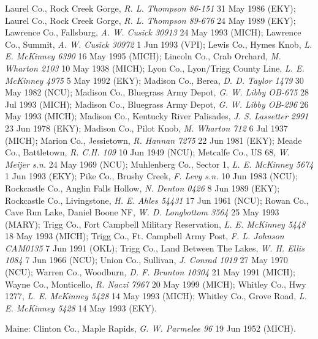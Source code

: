 \documentclass{article}
\begin{document}
Laurel Co., Rock Creek Gorge, \textit{R. L. Thompson 86-151} 31 May 1986 (EKY);
Laurel Co., Rock Creek Gorge, \textit{R. L. Thompson 89-676} 24 May 1989 (EKY);
Lawrence Co., Fallsburg, \textit{A. W. Cusick 30913} 24 May 1993 (MICH);
Lawrence Co., Summit, \textit{A. W. Cusick 30972} 1 Jun 1993 (VPI);
Lewis Co., Hymes Knob, \textit{L. E. McKinney 6390} 16 May 1995 (MICH);
Lincoln Co., Crab Orchard, \textit{M. Wharton 2103} 10 May 1938 (MICH);
Lyon Co., Lyon/Trigg County Line, \textit{L. E. McKinney 4975} 5 May 1992 (EKY);
Madison Co., Berea, \textit{D. D. Taylor 1479} 30 May 1982 (NCU);
Madison Co., Bluegrass Army Depot, \textit{G. W. Libby OB-675} 28 Jul 1993 (MICH);
Madison Co., Bluegrass Army Depot, \textit{G. W. Libby OB-296} 26 May 1993 (MICH);
Madison Co., Kentucky River Palisades, \textit{J. S. Lassetter 2991} 23 Jun 1978 (EKY);
Madison Co., Pilot Knob, \textit{M. Wharton 712} 6 Jul 1937 (MICH);
Marion Co., Jessietown, \textit{R. Hannan 7275} 22 Jun 1981 (EKY);
Meade Co., Battletown, \textit{R. C.H. 109} 10 Jun 1949 (NCU);
Metcalfe Co., US 68, \textit{W. Meijer s.n.} 24 May 1969 (NCU);
Muhlenberg Co., Sector 1, \textit{L. E. McKinney 5674} 1 Jun 1993 (EKY);
Pike Co.,  Brushy Creek, \textit{F. Levy s.n.} 10 Jun 1983 (NCU);
Rockcastle Co., Anglin Falls Hollow, \textit{N. Denton 0426} 8 Jun 1989 (EKY);
Rockcastle Co., Livingstone, \textit{H. E. Ahles 54431} 17 Jun 1961 (NCU);
Rowan Co., Cave Run Lake, Daniel Boone NF, \textit{W. D. Longbottom 3564} 25 May 1993 (MARY);
Trigg Co., Fort Campbell Military Reservation, \textit{L. E. McKinney 5448} 18 May 1993 (MICH);
Trigg Co., Ft. Campbell Army Post, \textit{F. L. Johnson CAM0135} 7 Jun 1991 (OKL);
Trigg Co., Land Between The Lakes, \textit{W. H. Ellis 1084} 7 Jun 1966 (NCU);
Union Co., Sullivan, \textit{J. Conrad 1019} 27 May 1970 (NCU);
Warren Co., Woodburn, \textit{D. F. Brunton 10304} 21 May 1991 (MICH);
Wayne Co., Monticello, \textit{R. Naczi 7967} 20 May 1999 (MICH);
Whitley Co., Hwy 1277, \textit{L. E. McKinney 5428} 14 May 1993 (MICH);
Whitley Co., Grove Road, \textit{L. E. McKinney 5428} 14 May 1993 (EKY).

Maine:
Clinton Co., Maple Rapids, \textit{G. W. Parmelee 96} 19 Jun 1952 (MICH).
\end{document}
